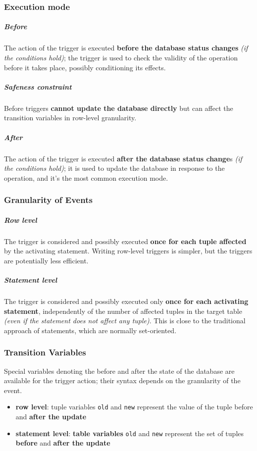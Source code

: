 \documentclass[english]{article}
\begin{document}
\subsubsection{Execution mode}

\subparagraph*{Before}
The action of the trigger is executed \textbf{before the database status changes} \textit{(if the conditions hold)};
the trigger is used to check the validity of the operation before it takes place, possibly conditioning its effects.

\subparagraph*{Safeness constraint} Before triggers \textbf{cannot update the database directly} but can affect the transition variables in row-level granularity.

\subparagraph*{After}

The action of the trigger is executed \textbf{after the database status change}s \textit{(if the conditions hold)};
it is used to update the database in response to the operation, and it's the most common execution mode.

\subsubsection{Granularity of Events}

\subparagraph*{Row level}
The trigger is considered and possibly executed \textbf{once for each tuple affected} by the activating statement.
Writing row-level triggers is simpler, but the triggers are potentially less efficient.

\subparagraph*{Statement level}
The trigger is considered and possibly executed only \textbf{once for each activating statement}, independently of the number of affected tuples in the target table \textit{(even if the statement does not affect any tuple)}.
This is close to the traditional approach of \sql statements, which are normally set-oriented.

\subsubsection{Transition Variables}

Special variables denoting the before and after the state of the database are available for the trigger action;
their syntax depends on the granularity of the event.

\begin{itemize}
  \item \textbf{row level}: tuple variables \texttt{old} and \texttt{new} represent the value of the tuple before and \textbf{after the update}
  \item \textbf{statement level}: \textbf{table variables} \texttt{old} and \texttt{new} represent the set of tuples \textbf{before} and \textbf{after the update}
\end{itemize}
\end{document}
